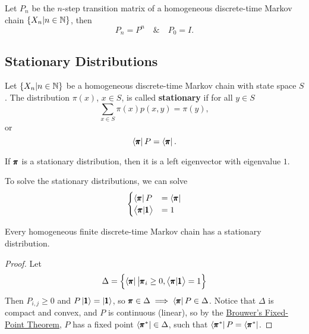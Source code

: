 \begin{corollary}
    Let $P_n$ be the $n$-step transition matrix of a homogeneous discrete-time Markov chain $\{X_n | n \in \mathbb{N}\}$, then 
    \begin{equation*}
        P_n = P^n \quad \& \quad P_0 = I.
    \end{equation*}
\end{corollary}

\subsection{Stationary Distributions}

\begin{definition}[Stationarity]
    Let $\{ X_n | n \in \mathbb{N} \}$ be a homogeneous discrete-time Markov chain with state space $S$. The distribution $\pi(x)$, $x \in S$, is called \textbf{stationary} if for all $y \in S$
    \begin{equation*}
        \sum_{x \in S} \pi(x) p(x,y) = \pi(y),
    \end{equation*}
    or 
    \begin{equation*}
        \left< \pmb{\pi} \right| P = \left< \pmb{\pi} \right|.
    \end{equation*}
\end{definition}

\begin{remark}
    If $\pmb{\pi}$ is a stationary distribution, then it is a left eigenvector with eigenvalue $1$.
\end{remark}

\begin{remark}
    To solve the stationary distributions, we can solve 
    \begin{equation*}
        \begin{cases}
            \left< \pmb{\pi} \right| P & = \left< \pmb{\pi} \right| \\ 
            \left< \pmb{\pi} | \pmb{1} \right > & = 1
        \end{cases}
    \end{equation*}
\end{remark}

\begin{theorem}\label{stationary distribution exists}
    Every homogeneous finite discrete-time Markov chain has a stationary distribution.
\end{theorem}
\begin{proof}
    Let 
    \begin{equation*}
        \Delta = \left\{ \left< \pmb{\pi} \right| \big | \pmb{\pi}_i \ge 0, \left<\pmb{\pi} | \pmb{1} \right> = 1 \right\}
    \end{equation*}
    Then $P_{i,j} \ge 0$ and $P \left| \pmb{1} \right> = \left| \pmb{1} \right>$, so $\pmb{\pi} \in \Delta \implies \left< \pmb{\pi} \right| P \in \Delta$. Notice that $\Delta$ is compact and convex, and $P$ is continuous (linear), so by the \href{https://en.wikipedia.org/wiki/Brouwer_fixed-point_theorem}{Brouwer's Fixed-Point Theorem}, $P$ has a fixed point $\left< \pmb{\pi}^* \right| \in \Delta$, such that $\left< \pmb{\pi}^* \right| P = \left< \pmb{\pi}^* \right|$.
\end{proof}

